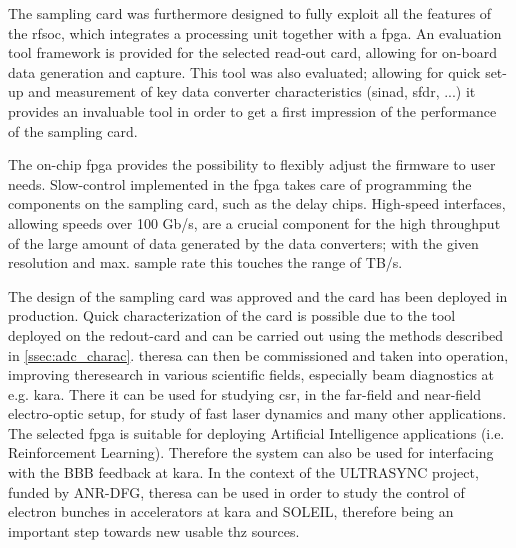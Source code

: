 The sampling card was furthermore designed to fully exploit all the features of the \gls{rfsoc}, which integrates a processing unit together with a \gls{fpga}.
An evaluation tool framework is provided for the selected read-out card, allowing for on-board data generation and capture.
This tool was also evaluated; allowing for quick set-up and measurement of key data converter characteristics (\gls{sinad}, \gls{sfdr}, ...) it provides an invaluable tool in order to get a first impression of the performance of the sampling card.

The on-chip \gls{fpga} provides the possibility to flexibly adjust the firmware to user needs. 
Slow-control implemented in the \gls{fpga} takes care of programming the components on the sampling card, such as the delay chips.
High-speed interfaces, allowing speeds over 100 Gb/s, are a crucial component for the high throughput of the large amount of data generated by the data converters; with the given resolution and max. sample rate this touches the range of TB/s.


The design of the sampling card was approved and the card has been deployed in production.
Quick characterization of the card is possible due to the tool deployed on the redout-card and can be carried out using the methods described in \autoref{ssec:adc_charac}.
\gls{theresa} can then be commissioned and taken into operation, improving theresearch in various scientific fields, especially beam diagnostics at e.g. \gls{kara}. 
There it can be used for studying \gls{csr}, in the far-field and near-field electro-optic setup, for study of fast laser dynamics and many other applications.
The selected \gls{fpga} is suitable for deploying Artificial Intelligence applications (i.e. Reinforcement Learning).
Therefore the system can also be used for interfacing with the BBB feedback at \gls{kara}.
In the context of the ULTRASYNC project, funded by ANR-DFG, \gls{theresa} can be used in order to study the control of electron bunches in accelerators at \gls{kara} and SOLEIL, therefore being an important step towards new usable \gls{thz} sources. 
 

